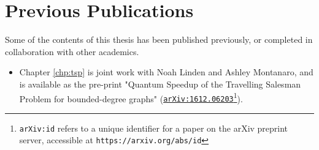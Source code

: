 \chapter*{Previous Publications}

Some of the contents of this thesis has been published previously, or completed in collaboration with other academics.

\begin{itemize}
\item Chapter \ref{chp:tsp} is joint work with Noah Linden and Ashley Montanaro, and is available as the pre-print "Quantum Speedup of the Travelling Salesman Problem for bounded-degree graphs" ({\tt \href{https://arxiv.org/abs/1612.06203}{arXiv:1612.06203}}\footnote{{\tt arXiv:id} refers to a unique identifier for a paper on the arXiv preprint server, accessible at {\tt https://arxiv.org/abs/id}}).
\end{itemize}